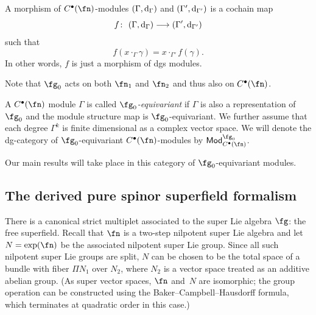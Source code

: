 \documentclass[10pt,a4paper]{amsart}
\numberwithin{equation}{section}
\def\cat#1{\ensuremath{\mathsf{#1}}}
\DeclareMathOperator{\Mod}{\cat{Mod}}
\def\d{{\rm d}}
\begin{document}
\begin{dfn}
	A morphism of $C^\bullet(\fn)$-modules $(\Gamma , \d_\Gamma)$ and $(\Gamma' , \d_{\Gamma'})$ is a cochain map
	\begin{equation*}
	f \colon \ (\Gamma , \d_\Gamma) \longrightarrow (\Gamma' , \d_{\Gamma'})
	\end{equation*}
	such that
	\begin{equation*}
	f(x \cdot_\Gamma \gamma) = x \cdot_{\Gamma'} f(\gamma) .
	\end{equation*}
	In other words, $f$ is just a morphism of dgs modules.
\end{dfn}
Note that $\fg_0$ acts on both $\fn_1$ and $\fn_2$ and thus also on $C^\bullet(\fn)$.

\begin{dfn}
	A $C^\bullet(\fn)$ module $\Gamma$ is called \emph{$\fg_0$-equivariant} if $\Gamma$ is also a representation of $\fg_0$ and the module structure map is $\fg_0$-equivariant. We further assume that each degree $\Gamma^k$ is finite dimensional as a complex vector space. We will denote the dg-category of $\fg_0$-equivariant $C^\bullet(\fn)$-modules by $\Mod_{C^\bullet(\fn)}^{\fg_0}$.
\end{dfn}

Our main results will take place in this category of $\fg_0$-equivariant modules.

\subsection{The derived pure spinor superfield formalism}

There is a canonical strict multiplet associated to the super Lie algebra $\fg$: the free superfield. Recall that $\fn$ is a two-step nilpotent super Lie algebra and let $N = \exp(\fn)$ be the associated nilpotent super Lie group. Since all such nilpotent super Lie groups are split, $N$ can be chosen to be the total space of a bundle with fiber $\Pi N_1$ over $N_2$, where $N_2$ is a vector space treated as an additive abelian group. (As super vector spaces, $\fn$ and~$N$ are isomorphic; the group operation can be constructed using the Baker--Campbell--Hausdorff formula, which terminates at quadratic order in this case.)
\end{document}
